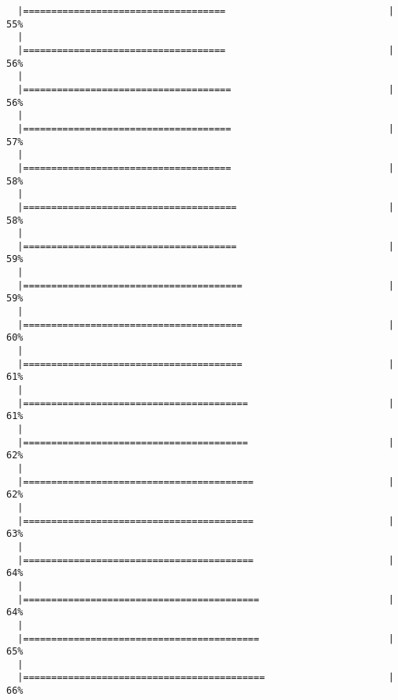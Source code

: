 \begin{knitrout}
\begin{kframe}
\begin{verbatim}
  |====================================                             |  55%
  |                                                                       
  |====================================                             |  56%
  |                                                                       
  |=====================================                            |  56%
  |                                                                       
  |=====================================                            |  57%
  |                                                                       
  |=====================================                            |  58%
  |                                                                       
  |======================================                           |  58%
  |                                                                       
  |======================================                           |  59%
  |                                                                       
  |=======================================                          |  59%
  |                                                                       
  |=======================================                          |  60%
  |                                                                       
  |=======================================                          |  61%
  |                                                                       
  |========================================                         |  61%
  |                                                                       
  |========================================                         |  62%
  |                                                                       
  |=========================================                        |  62%
  |                                                                       
  |=========================================                        |  63%
  |                                                                       
  |=========================================                        |  64%
  |                                                                       
  |==========================================                       |  64%
  |                                                                       
  |==========================================                       |  65%
  |                                                                       
  |===========================================                      |  66%

\end{verbatim}
\end{kframe}
\end{knitrout}

